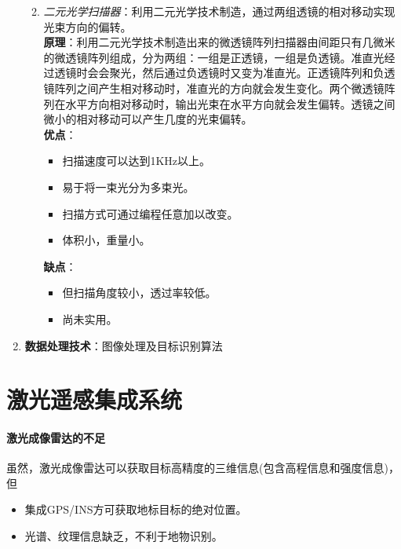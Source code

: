 \begin{enumerate}
\begin{enumerate}
\begin{itemize}
			\end{itemize}
		\item \textit{二元光学扫描器}：利用二元光学技术制造，通过两组透镜的相对移动实现光束方向的偏转。\\
		\textbf{原理}：利用二元光学技术制造出来的微透镜阵列扫描器由间距只有几微米的微透镜阵列组成，分为两组：一组是正透镜，一组是负透镜。准直光经过透镜时会会聚光，然后通过负透镜时又变为准直光。正透镜阵列和负透镜阵列之间产生相对移动时，准直光的方向就会发生变化。两个微透镜阵列在水平方向相对移动时，输出光束在水平方向就会发生偏转。透镜之间微小的相对移动可以产生几度的光束偏转。\\
		\textbf{优点}：\begin{itemize}
			\item 扫描速度可以达到1KHz以上。
			\item 易于将一束光分为多束光。
			\item 扫描方式可通过编程任意加以改变。
			\item 体积小，重量小。
		\end{itemize}
		\textbf{缺点}：\begin{itemize}
			\item 但扫描角度较小，透过率较低。
			\item 尚未实用。
		\end{itemize}
	\end{enumerate}
	\item \textbf{数据处理技术}：图像处理及目标识别算法
\end{enumerate}

\section{激光遥感集成系统}
\paragraph{激光成像雷达的不足}虽然，激光成像雷达可以获取目标高精度的三维信息(包含高程信息和强度信息)，但
\begin{itemize}
	\item 集成GPS/INS方可获取地标目标的绝对位置。
	\item 光谱、纹理信息缺乏，不利于地物识别。
\end{itemize}
